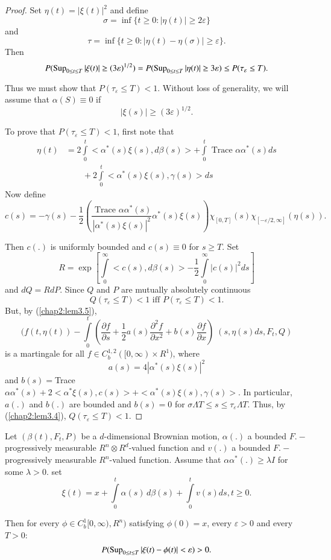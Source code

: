 \begin{proof}
Set $\eta(t)=|\xi(t)|^2$ and define 
$$
\sigma=\inf \{t \geq 0: |\eta(t)|\geq 2 \varepsilon \}
$$\pageoriginale
and
$$
\tau= \inf \{t \geq 0: |\eta(t)-\eta(\sigma)| \geq \varepsilon \}.
$$
Then
$$
P(\operatorname{Sup}_{0 \leq t \leq T}|\xi (t)|\geq (3 \varepsilon)^{1/2})=P(\operatorname{Sup}_{0
  \leq t \leq T}|\eta(t)| \geq 3 \varepsilon)\leq
P(\tau_{\varepsilon}\leq T). 
$$

Thus we must show that $P(\tau_{\varepsilon} \leq T)< 1$. Without loss
of generality, we will assume that $\alpha(S)\equiv 0$ if 
$$
|\xi(s)|\geq (3 \varepsilon)^{1/2}.
$$

To prove that $P(\tau_{\varepsilon} \leq T)< 1$, first note that
\begin{align*}
\eta(t) & =2\int\limits_0^t < \alpha^*(s)\xi(s), d \beta(s)>+
\int\limits_0^t \text{ Trace } \alpha\alpha^*(s) ds\\
& \qquad +2\int\limits_0^t < \alpha^*(s) \xi(s), \gamma(s)>ds 
\end{align*}
Now define
$$
c(s)=-\gamma(s)-\frac{1}{2}(\frac{\text{ Trace }\alpha \alpha^*
  (s)}{|\alpha^*(s)\xi(s)|^2}\alpha^*(s) \xi (s))\chi_{[0,
    T]}(s)\chi_{[-\varepsilon/2, \infty]}(\eta(s)). 
$$

Then $c(.)$ is uniformly bounded and $c(s)\equiv 0$ for $s \geq
T$. Set 
$$
R=\exp [\int\limits_0^\infty <c(s), d\beta(s)> -\frac{1}{2}
  \int\limits_0^\infty |c(s)|^2 ds] 
$$
and $dQ= RdP$. Since $Q$ and $P$ are mutually absolutely continuous 
$$
Q(\tau_{\varepsilon}\leq T)< 1 \text{ iff } P(\tau_{\varepsilon} \leq
  T) < 1. 
$$
But, by (\ref{chap2:lem3.5}),
$$
(f(t, \eta (t))- \int\limits_0^t (\frac{\partial f}{\partial
  s}+\frac{1}{2}a(s) \frac{\partial^2 f}{\partial
  x^2}+b(s)\frac{\partial f}{\partial x}) \; (s, \eta(s)ds, F_t, Q) 
$$\pageoriginale
is a martingale for all $f \in C_b^{1, 2}([0, \infty) \times
  R^1)$, where 
$$
a(s)=4|\alpha^*(s)\xi(s)|^2 
$$
and
$b(s)=$Trace $\alpha \alpha^*(s)+2 < \alpha^* \xi(s), c(s) > +
<\alpha^*(s)\xi (s), \gamma(s)>$. In particular, $a(.)$ and $b(.)$ are
bounded and $b(s)=0$ for $\sigma \Lambda T \leq s \leq
\tau_{\varepsilon} \Lambda T$. Thus, by (\ref{chap2:lem3.4}), $Q(\tau_{\varepsilon}
\leq T)< 1$.  
\end{proof}


\setcounter{coro}{8}
\begin{coro}\label{chap2:coro3.9}%
Let $(\beta(t), F_t,P)$ be a $d$-dimensional Brownian motion,
$\alpha(.)$ a bounded $F.-$progressively measurable $R^n\otimes
R^d$-valued function and $v(.)$ a bounded $F.-$progressively
measurable $R^n$-valued function. Assume that $\alpha \alpha^*(.)\geq
\lambda I$ for some $\lambda >0$. set 
$$
\xi(t)=x+\int\limits_0^t \alpha(s)\,d \beta(s)+\int\limits_0^t v(s)ds, 
t \geq 0. 
$$

Then for every $\phi \in C_b^1 [0, \infty), R^n)$ satisfying
  $\phi(0)=x$, every $\varepsilon > 0$ and every $T > 0$: 
$$
P(\operatorname{Sup}_{0 \leq t \leq T}|\xi(t)-\phi(t)|< \varepsilon)>0. 
$$
\end{coro}

